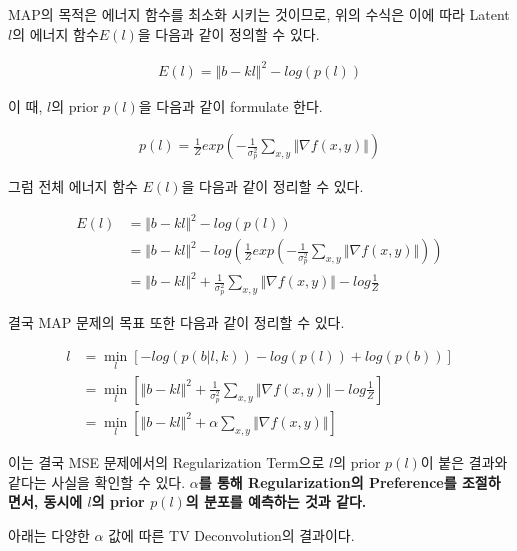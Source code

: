 \documentclass{report}
\begin{document}
MAP의 목적은 에너지 함수를 최소화 시키는 것이므로, 위의 수식은 이에 따라 Latent $l$의 에너지 함수$E(l)$을 다음과 같이 정의할 수 있다.

\begin{align*}
    E(l) = \Vert b-kl \Vert ^2 -log(p(l))
\end{align*}

이 때, $l$의 prior $p(l)$을 다음과 같이 formulate 한다.

\begin{align*}
    p(l) = \frac{1}{Z}exp(-\frac{1}{\sigma_p^2}\sum_{x,y}\Vert \nabla f(x,y) \Vert)
\end{align*}

그럼 전체 에너지 함수 $E(l)$을 다음과 같이 정리할 수 있다.

\begin{align*}
    E(l) &= \Vert b-kl \Vert ^2 -log(p(l)) \\
         &= \Vert b-kl \Vert ^2 -log(\frac{1}{Z}exp(-\frac{1}{\sigma_p^2}\sum_{x,y}\Vert \nabla f(x,y) \Vert)) \\
         &= \Vert b-kl \Vert ^2 + \frac{1}{\sigma_p^2} \sum_{x,y}\Vert \nabla f(x,y) \Vert -log\frac{1}{Z}
\end{align*}

결국 MAP 문제의 목표 또한 다음과 같이 정리할 수 있다.

\begin{align*}
    l &= \mathop{\min}\limits_{l} [-log(p(b|l,k)) -log(p(l)) + log(p(b))] \\
      &= \mathop{\min}\limits_{l} [\Vert b-kl \Vert ^2 + \frac{1}{\sigma_p^2} \sum_{x,y}\Vert \nabla f(x,y) \Vert -log\frac{1}{Z}] \\
      &= \mathop{\min}\limits_{l} [\Vert b-kl \Vert ^2 + \alpha \sum_{x,y}\Vert \nabla f(x,y) \Vert]
\end{align*}

이는 결국 MSE 문제에서의 Regularization Term으로 $l$의 prior $p(l)$이 붙은 결과와 같다는 사실을 확인할 수 있다.
\textbf{$\alpha$를 통해 Regularization의 Preference를 조절하면서, 동시에 $l$의 prior $p(l)$의 분포를 예측하는 것과 같다.}

아래는 다양한 $\alpha$ 값에 따른 TV Deconvolution의 결과이다.
\end{document}
